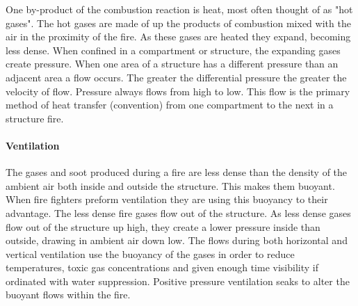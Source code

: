 \documentclass{article}
\begin{document}
One by-product of the combustion reaction is heat, most often thought of as "hot gases". The hot gases are made of up the products of combustion mixed with the air in the proximity of the fire. As these gases are heated they expand, becoming less dense. When confined in a compartment or structure, the expanding gases create pressure. When one area of a structure has a different pressure than an adjacent area a flow occurs. The greater the differential pressure the greater the velocity of flow. Pressure always flows from high to low. This flow is the primary method of heat transfer (convention) from one compartment to the next in a structure fire. 

\paragraph{Ventilation} \mbox{}

The gases and soot produced during a fire are less dense than the density of the ambient air both inside and outside the structure. This makes them buoyant. When fire fighters preform ventilation they are using this buoyancy to their advantage. The less dense fire gases flow out of the structure. As less dense gases flow out of the structure up high, they create a lower pressure inside than outside, drawing in ambient air down low. The flows during both horizontal and vertical ventilation use the buoyancy of the gases in order to reduce temperatures, toxic gas concentrations and given enough time visibility if ordinated with water suppression. Positive pressure ventilation seaks to alter the buoyant flows within the fire. 
\end{document}
